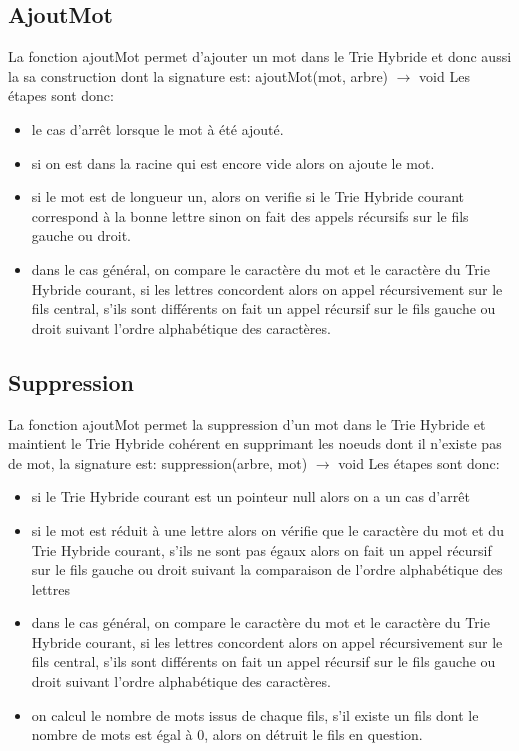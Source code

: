 \documentclass[a4paper,12pt]{report}
\begin{document}
\subsection{AjoutMot}
La fonction ajoutMot permet d'ajouter un mot dans le Trie Hybride et donc aussi la sa construction
dont la signature est: ajoutMot(mot, arbre) $\rightarrow$ void
Les étapes sont donc:
\begin{itemize}
 \item le cas d'arrêt lorsque le mot à été ajouté.
 \item si on est dans la racine qui est encore vide alors on ajoute le mot.
 \item si le mot est de longueur un, alors on verifie si le Trie Hybride courant correspond à la bonne lettre
 sinon on fait des appels récursifs sur le fils gauche ou droit.
 \item dans le cas général, on compare le caractère du mot et le caractère du Trie Hybride courant, si les lettres
 concordent alors on appel récursivement sur le fils central, s'ils sont différents on fait un appel récursif sur le
 fils gauche ou droit suivant l'ordre alphabétique des caractères.
\end{itemize}

\subsection{Suppression}
La fonction ajoutMot permet la suppression d'un mot dans le Trie Hybride et maintient le Trie Hybride cohérent en supprimant
les noeuds dont il n'existe pas de mot, la signature est: suppression(arbre, mot) $\rightarrow$ void
Les étapes sont donc:
\begin{itemize}
 \item si le Trie Hybride courant est un pointeur null alors on a un cas d'arrêt
 \item si le mot est réduit à une lettre alors on vérifie que le caractère du mot et du Trie Hybride courant, s'ils ne sont
 pas égaux alors on fait un appel récursif sur le fils gauche ou droit suivant la comparaison de l'ordre alphabétique des lettres
 \item dans le cas général, on compare le caractère du mot et le caractère du Trie Hybride courant, si les lettres
 concordent alors on appel récursivement sur le fils central, s'ils sont différents on fait un appel récursif sur le
 fils gauche ou droit suivant l'ordre alphabétique des caractères.
 \item on calcul le nombre de mots issus de chaque fils, s'il existe un fils dont le nombre de mots est égal à 0, alors on détruit
 le fils en question.
\end{itemize}
\end{document}

